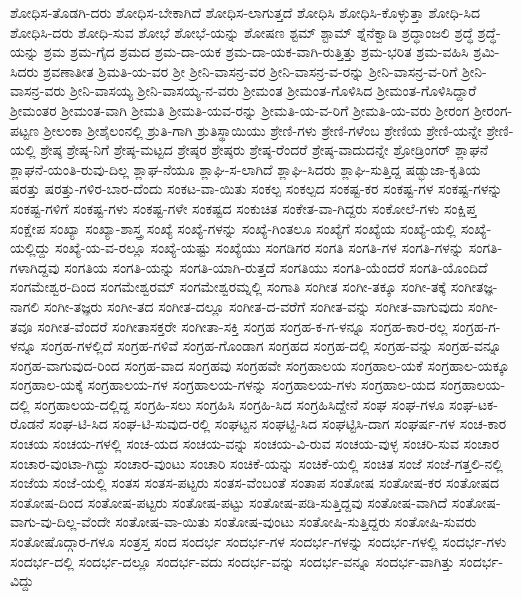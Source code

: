{ಶೋಧಿಸ-ತೊಡಗಿ-ದರು
ಶೋಧಿಸ-ಬೇಕಾಗಿದೆ
ಶೋಧಿಸ-ಲಾಗುತ್ತದೆ
ಶೋಧಿಸಿ
ಶೋಧಿಸಿ-ಕೊಳ್ಳುತ್ತಾ
ಶೋಧಿ-ಸಿದ
ಶೋಧಿಸಿ-ದರು
ಶೋಧಿ-ಸುವ
ಶೋಭೆ
ಶೋಭೆ-ಯನ್ನು
ಶೋಷಣ
ಶ್ಟಮ್
ಶ್ಟಾಮ್
ಶ್ನೆನೆಕ್ವಾಡಿ
ಶ್ರದ್ಧಾಂಜಲಿ
ಶ್ರದ್ಧೆ
ಶ್ರದ್ಧೆ-ಯನ್ನು
ಶ್ರಮ
ಶ್ರಮ-ಗೈದ
ಶ್ರಮದ
ಶ್ರಮ-ದಾ-ಯಕ
ಶ್ರಮ-ದಾ-ಯಕ-ವಾಗಿ-ರುತ್ತಿತ್ತು
ಶ್ರಮ-ಭರಿತ
ಶ್ರಮ-ವಹಿಸಿ
ಶ್ರಮಿ-ಸಿದರು
ಶ್ರವಣಾತೀತ
ಶ್ರಿಮತಿ-ಯ-ವರ
ಶ್ರೀ
ಶ್ರೀನಿ-ವಾಸನ್ರ-ವರ
ಶ್ರೀನಿ-ವಾಸನ್ರ-ವ-ರನ್ನು
ಶ್ರೀನಿ-ವಾಸನ್ರ-ವ-ರಿಗೆ
ಶ್ರೀನಿ-ವಾಸನ್ರ-ವರು
ಶ್ರೀನಿ-ವಾಸಯ್ಯ
ಶ್ರೀನಿ-ವಾಸಯ್ಯ-ನ-ವರು
ಶ್ರೀಮಂತ
ಶ್ರೀಮಂತ-ಗೊಳಿಸಿದ
ಶ್ರೀಮಂತ-ಗೊಳಿಸಿದ್ದಾರೆ
ಶ್ರೀಮಂತರ
ಶ್ರೀಮಂತ-ವಾಗಿ
ಶ್ರೀಮತಿ
ಶ್ರೀಮತಿ-ಯವ-ರನ್ನು
ಶ್ರೀಮತಿ-ಯ-ವ-ರಿಗೆ
ಶ್ರೀಮತಿ-ಯ-ವರು
ಶ್ರೀರಂಗ
ಶ್ರೀರಂಗ-ಪಟ್ಟಣ
ಶ್ರೀಲಂಕಾ
ಶ್ರೀಶೈಲಂನಲ್ಲಿ
ಶ್ರುತಿ-ಗಾಗಿ
ಶ್ರುತಿಸ್ಥಾಯಿಯು
ಶ್ರೇಣಿ-ಗಳು
ಶ್ರೇಣಿ-ಗಳೆಂಬ
ಶ್ರೇಣಿಯ
ಶ್ರೇಣಿ-ಯನ್ನೇ
ಶ್ರೇಣಿ-ಯಲ್ಲಿ
ಶ್ರೇಷ್ಠ
ಶ್ರೇಷ್ಠ-ನಿಗೆ
ಶ್ರೇಷ್ಠ-ಮಟ್ಟದ
ಶ್ರೇಷ್ಠರ
ಶ್ರೇಷ್ಠರು
ಶ್ರೇಷ್ಠ-ರೆಂದರೆ
ಶ್ರೇಷ್ಠ-ವಾದುದನ್ನೇ
ಶ್ರೋಡ್ರಿಂಗರ್
ಶ್ಲಾಘನೆ
ಶ್ಲಾಘನೆ-ಯಂತಿ-ರುವು-ದಿಲ್ಲ
ಶ್ಲಾಘ-ನೆಯೂ
ಶ್ಲಾಘಿ-ಸ-ಲಾಗಿದೆ
ಶ್ಲಾಘಿ-ಸಿದರು
ಶ್ಲಾಘಿ-ಸುತ್ತಿದ್ದ
ಷಡ್ಭುಜಾ-ಕೃತಿಯ
ಷರತ್ತು
ಷರತ್ತು-ಗಳಿರ-ಬಾರ-ದೆಂದು
ಸಂಕಟ-ವಾ-ಯಿತು
ಸಂಕಲ್ಪ
ಸಂಕಲ್ಪದ
ಸಂಕಷ್ಟ-ಕರ
ಸಂಕಷ್ಟ-ಗಳ
ಸಂಕಷ್ಟ-ಗಳನ್ನು
ಸಂಕಷ್ಟ-ಗಳಿಗೆ
ಸಂಕಷ್ಟ-ಗಳು
ಸಂಕಷ್ಟ-ಗಳೇ
ಸಂಕಷ್ಟದ
ಸಂಕುಚಿತ
ಸಂಕೇತ-ವಾ-ಗಿದ್ದರು
ಸಂಕೋಲೆ-ಗಳು
ಸಂಕ್ಷಿಪ್ತ
ಸಂಕ್ಷೇಪ
ಸಂಖ್ಯಾ
ಸಂಖ್ಯಾ-ಶಾಸ್ತ್ರ
ಸಂಖ್ಯೆ
ಸಂಖ್ಯೆ-ಗಳನ್ನು
ಸಂಖ್ಯೆ-ಗಿಂತಲೂ
ಸಂಖ್ಯೆಗೆ
ಸಂಖ್ಯೆಯ
ಸಂಖ್ಯೆ-ಯಲ್ಲಿ
ಸಂಖ್ಯೆ-ಯಲ್ಲಿದ್ದು
ಸಂಖ್ಯೆ-ಯ-ವ-ರಲ್ಲೂ
ಸಂಖ್ಯೆ-ಯಷ್ಟು
ಸಂಖ್ಯೆಯು
ಸಂಗಡಿಗರ
ಸಂಗತಿ
ಸಂಗತಿ-ಗಳ
ಸಂಗತಿ-ಗಳನ್ನು
ಸಂಗತಿ-ಗಳಾಗಿದ್ದವು
ಸಂಗತಿಯ
ಸಂಗತಿ-ಯನ್ನು
ಸಂಗತಿ-ಯಾಗಿ-ರುತ್ತದೆ
ಸಂಗತಿಯು
ಸಂಗತಿ-ಯೆಂದರೆ
ಸಂಗತಿ-ಯೊಂದಿದೆ
ಸಂಗಮೇಶ್ವರ-ದಿಂದ
ಸಂಗಮೇಶ್ವರಮ್
ಸಂಗಮೇಶ್ವರಮ್ನಲ್ಲಿ
ಸಂಗಾತಿ
ಸಂಗೀತ
ಸಂಗೀ-ತಕ್ಕೂ
ಸಂಗೀ-ತಕ್ಕೆ
ಸಂಗೀತಜ್ಞ-ನಾಗಲಿ
ಸಂಗೀ-ತಜ್ಞರು
ಸಂಗೀ-ತದ
ಸಂಗೀತ-ದಲ್ಲೂ
ಸಂಗೀತ-ದ-ವರೆಗೆ
ಸಂಗೀತ-ವನ್ನು
ಸಂಗೀತ-ವಾಗುವುದು
ಸಂಗೀ-ತವೂ
ಸಂಗೀತ-ವೆಂದರೆ
ಸಂಗೀತಾಸಕ್ತರೇ
ಸಂಗೀತಾ-ಸಕ್ತಿ
ಸಂಗ್ರಹ
ಸಂಗ್ರಹ-ಕ-ಗ-ಳನ್ನೂ
ಸಂಗ್ರಹ-ಕಾರ-ರಲ್ಲ
ಸಂಗ್ರಹ-ಗ-ಳನ್ನೂ
ಸಂಗ್ರಹ-ಗಳಲ್ಲಿದೆ
ಸಂಗ್ರಹ-ಗಳಿವೆ
ಸಂಗ್ರಹ-ಗೊಂಡಾಗ
ಸಂಗ್ರಹದ
ಸಂಗ್ರಹ-ದಲ್ಲಿ
ಸಂಗ್ರಹ-ವನ್ನು
ಸಂಗ್ರಹ-ವನ್ನೂ
ಸಂಗ್ರಹ-ವಾಗುವುದ-ರಿಂದ
ಸಂಗ್ರಹ-ವಾದ
ಸಂಗ್ರಹವು
ಸಂಗ್ರಹವೇ
ಸಂಗ್ರಹಾಲಯ
ಸಂಗ್ರಹಾಲ-ಯಕೆ
ಸಂಗ್ರಹಾಲ-ಯಕ್ಕೂ
ಸಂಗ್ರಹಾಲ-ಯಕ್ಕೆ
ಸಂಗ್ರಹಾಲಯ-ಗಳ
ಸಂಗ್ರಹಾಲಯ-ಗಳನ್ನು
ಸಂಗ್ರಹಾಲಯ-ಗಳು
ಸಂಗ್ರಹಾಲ-ಯದ
ಸಂಗ್ರಹಾಲಯ-ದಲ್ಲಿ
ಸಂಗ್ರಹಾಲಯ-ದಲ್ಲಿದ್ದ
ಸಂಗ್ರಹಿ-ಸಲು
ಸಂಗ್ರಹಿಸಿ
ಸಂಗ್ರಹಿ-ಸಿದ
ಸಂಗ್ರಹಿಸಿದ್ದೇನೆ
ಸಂಘ
ಸಂಘ-ಗಳೂ
ಸಂಘ-ಟಕ-ರೊಡನೆ
ಸಂಘ-ಟಿ-ಸಿದ
ಸಂಘ-ಟಿ-ಸುವುದ-ರಲ್ಲಿ
ಸಂಘಟ್ಟನ
ಸಂಘಟ್ಟಿ-ಸಿದ
ಸಂಘಟ್ಟಿಸಿ-ದಾಗ
ಸಂಘರ್ಷ-ಗಳ
ಸಂಚ-ಕಾರ
ಸಂಚಯ
ಸಂಚಯ-ಗಳಲ್ಲಿ
ಸಂಚ-ಯದ
ಸಂಚಯ-ವನ್ನು
ಸಂಚಯ-ವಿ-ರುವ
ಸಂಚಯ-ವುಳ್ಳ
ಸಂಚರಿ-ಸುವ
ಸಂಚಾರ
ಸಂಚಾರ-ವುಂಟಾ-ಗಿದ್ದು
ಸಂಚಾರ-ವುಂಟು
ಸಂಚಾರಿ
ಸಂಚಿಕೆ-ಯನ್ನು
ಸಂಚಿಕೆ-ಯಲ್ಲಿ
ಸಂಚಿತ
ಸಂಜೆ
ಸಂಜೆ-ಗತ್ತಲಿ-ನಲ್ಲಿ
ಸಂಜೆಯ
ಸಂಜೆ-ಯಲ್ಲಿ
ಸಂತಸ
ಸಂತಸ-ಪಟ್ಟರು
ಸಂತಸ-ವೆಂಬಂತೆ
ಸಂತಾಪ
ಸಂತೋಷ
ಸಂತೋಷ-ಕರ
ಸಂತೋಷದ
ಸಂತೋಷ-ದಿಂದ
ಸಂತೋಷ-ಪಟ್ಟರು
ಸಂತೋಷ-ಪಟ್ಟು
ಸಂತೋಷ-ಪಡಿ-ಸುತ್ತಿದ್ದವು
ಸಂತೋಷ-ವಾಗಿದೆ
ಸಂತೋಷ-ವಾಗು-ವು-ದಿಲ್ಲ-ವೆಂದೇ
ಸಂತೋಷ-ವಾ-ಯಿತು
ಸಂತೋಷ-ವುಂಟು
ಸಂತೋಷಿ-ಸುತ್ತಿದ್ದರು
ಸಂತೋಷಿ-ಸುವರು
ಸಂತೋಷೊದ್ಗಾರ-ಗಳೂ
ಸಂತ್ರಸ್ತ
ಸಂದ
ಸಂದರ್ಭ
ಸಂದರ್ಭ-ಗಳ
ಸಂದರ್ಭ-ಗಳನ್ನು
ಸಂದರ್ಭ-ಗಳಲ್ಲಿ
ಸಂದರ್ಭ-ಗಳು
ಸಂದರ್ಭ-ದಲ್ಲಿ
ಸಂದರ್ಭ-ದಲ್ಲೂ
ಸಂದರ್ಭ-ವದು
ಸಂದರ್ಭ-ವನ್ನು
ಸಂದರ್ಭ-ವನ್ನೂ
ಸಂದರ್ಭ-ವಾಗಿತ್ತು
ಸಂದರ್ಭ-ವಿದ್ದು
}

